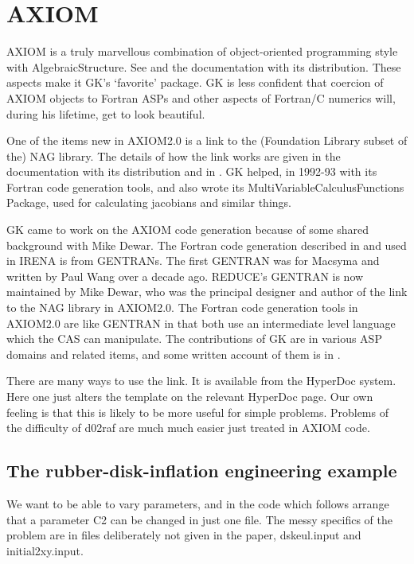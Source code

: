 \section*{AXIOM}

AXIOM is a truly marvellous combination of object-oriented programming
style with AlgebraicStructure.
See \cite{JS} and the documentation with its distribution.
These aspects make it GK's `favorite' package.
GK is less confident that coercion of AXIOM objects to Fortran
ASPs and other aspects of Fortran/C numerics will, during 
his lifetime, get to look beautiful.

One of the items new in AXIOM2.0 is a link to the
(Foundation Library subset of the) NAG library.
The details of how the link works are given in
the documentation with its distribution and in \cite{D}.
GK helped, in 1992-93 with its Fortran code generation tools,
and also wrote its MultiVariableCalculusFunctions Package,
used for calculating jacobians and similar things.
\goodbreak

GK came to work on the AXIOM code generation because of
some shared background with Mike Dewar.
The Fortran code generation described in \cite{BK,K92}
and used in IRENA is from GENTRANs.
The first GENTRAN was for Macsyma and written by Paul Wang
over a decade ago.
REDUCE's GENTRAN is now maintained by Mike Dewar, who was
the principal designer and author of the link 
to the NAG library in AXIOM2.0.
The Fortran code generation tools in AXIOM2.0 are like
GENTRAN in that both use an intermediate level language
which the CAS can manipulate. 
The contributions of GK are in various ASP domains and
related items, and some written account of them is in \cite{KN}.

There are many ways to use the link. It is available from
the HyperDoc system.
Here one just alters the template on the relevant HyperDoc
page.
Our own feeling is that this is likely to be more useful
for simple problems. Problems of the difficulty of d02raf
are much much easier just treated in AXIOM code.

\subsection*{The rubber-disk-inflation engineering example}

We want to be able to vary parameters, and in the code which
follows arrange that a parameter C2 can be changed in just
one file.
The messy specifics of the problem are in files deliberately
not given in the paper, dskeul.input and initial2xy.input.


